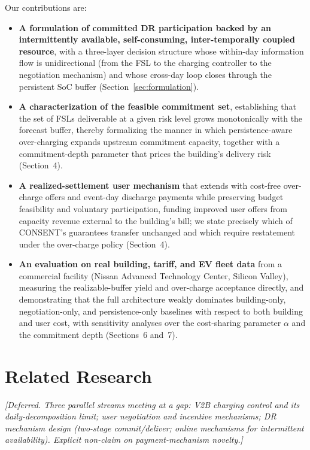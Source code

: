 Our contributions are:
\begin{itemize}
\item \textbf{A formulation of committed DR participation backed by an
intermittently available, self-consuming, inter-temporally coupled
resource}, with a three-layer decision structure whose within-day
information flow is unidirectional (from the FSL to the charging controller
to the negotiation mechanism) and whose cross-day loop closes through the
persistent SoC buffer (Section~\ref{sec:formulation}).
\item \textbf{A characterization of the feasible commitment set}, establishing
that the set of FSLs deliverable at a given risk level grows monotonically
with the forecast buffer, thereby formalizing the manner in which
persistence-aware over-charging expands upstream commitment capacity,
together with a commitment-depth parameter that prices the building's delivery
risk (Section~4).
\item \textbf{A realized-settlement user mechanism} that extends \cite{sen2026consent}
with cost-free over-charge offers and event-day discharge payments while
preserving budget feasibility and voluntary participation, funding improved
user offers from capacity revenue external to the building's bill; we state
precisely which of CONSENT's guarantees transfer unchanged and which
require restatement under the over-charge policy (Section~4).
\item \textbf{An evaluation on real building, tariff, and EV fleet data}
from a commercial facility (Nissan Advanced Technology Center, Silicon
Valley), measuring the realizable-buffer yield and over-charge acceptance
directly, and demonstrating that the full architecture weakly dominates
building-only, negotiation-only, and persistence-only baselines with
respect to both building and user cost, with sensitivity analyses over the
cost-sharing parameter $\alpha$ \cite{sen2026consent} and the commitment depth
(Sections~6 and~7).
\end{itemize}
 
\section{Related Research}
\textit{[Deferred. Three parallel streams meeting at a gap: V2B charging
control and its daily-decomposition limit; user negotiation and incentive
mechanisms; DR mechanism design (two-stage commit/deliver; online
mechanisms for intermittent availability). Explicit non-claim on
payment-mechanism novelty.]}
 
